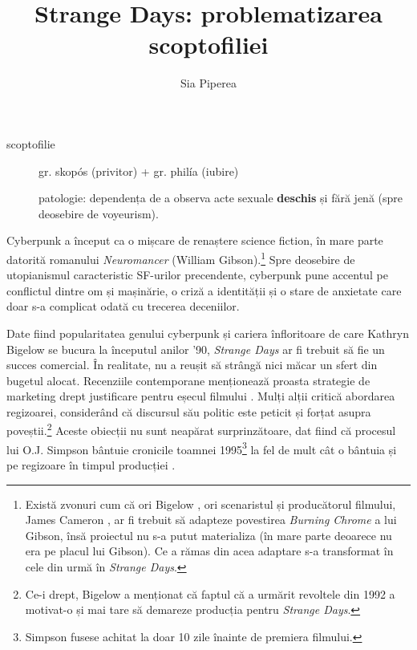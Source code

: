 \documentclass[12pt]{article}
\title{\textbf{Strange Days: problematizarea scoptofiliei}}
\author{Sia Piperea}
\date{} %
\begin{document}
	 	
\maketitle

\begin{description}
	\item[scoptofilie]\par
	gr. \dedouble skopós\sqtworight\: (privitor) + gr. \dedouble philía\sqtworight\: (iubire) \par
	patologie: dependența de a observa acte sexuale  \textbf{deschis} și fără jenă (spre deosebire de voyeurism). \par
\end{description}
		 	
Cyberpunk a început ca o mișcare de renaștere science fiction, în mare parte datorită romanului \textit{Neuromancer} (William Gibson).\footnote{Există zvonuri cum că ori Bigelow \cite{Salza1994a}, ori scenaristul și producătorul filmului, James Cameron \cite{Henry2023a}, ar fi trebuit să adapteze povestirea \textit{Burning Chrome} a lui Gibson, însă proiectul nu s-a putut materializa (în mare parte deoarece nu era pe placul lui Gibson). Ce a rămas din acea adaptare s-a transformat în cele din urmă în \textit{Strange Days}.} Spre deosebire de utopianismul caracteristic SF-urilor precendente, cyberpunk pune accentul pe conflictul dintre om și mașinărie, o criză a identității și o stare de anxietate care doar s-a complicat odată cu trecerea deceniilor.\par

Date fiind popularitatea genului cyberpunk și cariera înfloritoare de care Kathryn Bigelow se bucura la începutul anilor '90, \textit{Strange Days} ar fi trebuit să fie un succes comercial. În realitate, nu a reușit să strângă nici măcar un sfert din bugetul alocat. Recenziile contemporane menționează proasta strategie de marketing drept justificare pentru eșecul filmului \cite{McCarthy1995a}. Mulți alții critică abordarea regizoarei, considerând că discursul său politic este peticit și forțat asupra poveștii.\footnote{Ce-i drept, Bigelow a menționat că faptul că a urmărit revoltele din 1992 a motivat-o și mai tare să demareze producția pentru \textit{Strange Days}.} Aceste obiecții nu sunt neapărat surprinzătoare, dat fiind că procesul lui O.J. Simpson bântuie cronicile toamnei 1995\footnote{Simpson fusese achitat la doar 10 zile înainte de premiera filmului.} la fel de mult cât o bântuia și pe regizoare în timpul producției \cite{Willistein1995a}.\par
\end{document}
